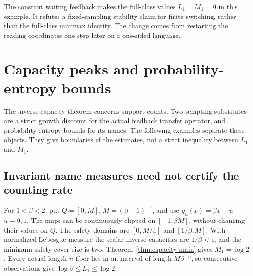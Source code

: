 \documentclass[11pt,reqno]{amsart}
\numberwithin{equation}{section}
\theoremstyle{definition}
\begin{document}
The constant waiting feedback makes the full-class values
$L_1=M_1=0$ in this example. It refutes a fixed-sampling
stability claim for finite switching, rather than the full-class
minimax identity. The change comes from restarting the reading
coordinates one step later on a one-sided language.


\section{Capacity peaks and probability-entropy bounds}
\label{app:capacity-boundaries}

The inverse-capacity theorem concerns support counts. Two tempting
substitutes are a strict growth discount for the actual feedback
transfer operator, and probability-entropy bounds for its names.
The following examples separate these objects. They give boundaries
of the estimates, not a strict inequality between $L_1$ and $M_1$.

\subsection{Invariant name measures need not certify the counting rate}

For $1<\beta<2$, put $Q=[0,M]$, $M=(\beta-1)^{-1}$, and use
$g_u(x)=\beta x-u$, $u=0,1$. The maps can be continuously clipped
on $[-1,\beta M]$, without changing their values on $Q$.
The safety domains are $[0,M/\beta]$ and $[1/\beta,M]$.
With normalized Lebesgue measure the scalar inverse capacities
are $1/\beta<1$, and the minimum safety-cover size is two.
Theorem~\ref{thm:capacity-main} gives $M_1=\log2$.
Every actual length-$n$ fiber lies in an interval of length
$M\beta^{-n}$, so consecutive observations give
$\log\beta\le L_1\le\log2$.
\end{document}
